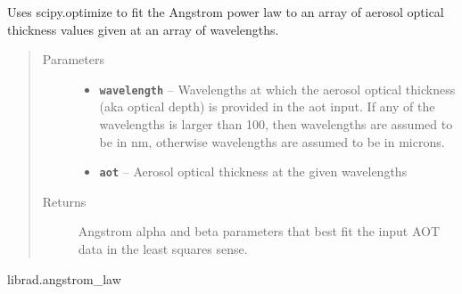 \documentclass[a4paper,10pt,english]{sphinxmanual}
\begin{document}

\begin{fulllineitems}
\label{packages:librad.angstrom_law_fit}
Uses scipy.optimize to fit the Angstrom power law to an array of aerosol optical thickness values given
at an array of wavelengths.
\begin{quote}\begin{description}
\item[{Parameters}] \leavevmode\begin{itemize}
\item {} 
\textbf{\texttt{wavelength}} -- Wavelengths at which the aerosol optical thickness (aka optical depth) is provided in the aot
input. If any of the wavelengths is larger than 100, then wavelengths are assumed to be in nm, otherwise
wavelengths are assumed to be in microns.

\item {} 
\textbf{\texttt{aot}} -- Aerosol optical thickness at the given wavelengths

\end{itemize}

\item[{Returns}] \leavevmode
Angstrom alpha and beta parameters that best fit the input AOT data in the least squares sense.

\end{description}\end{quote}




librad.angstrom\_law



\end{fulllineitems}

\end{document}
